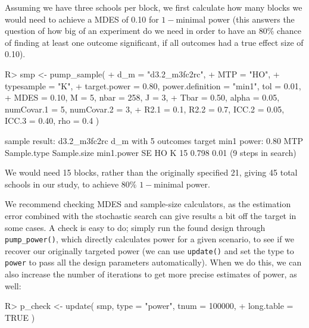\documentclass[
]{jss}
\begin{document}
Assuming we have three schools per block, we first calculate how many
blocks we would need to achieve a MDES of 0.10 for \(1-\)minimal power
(this answers the question of how big of an experiment do we need in
order to have an 80\% chance of finding at least one outcome
significant, if all outcomes had a true effect size of 0.10).

\begin{CodeChunk}
\begin{CodeInput}
R> smp <- pump_sample(
+   d_m = "d3.2_m3fc2rc",
+   MTP = "HO",
+   typesample = "K",
+   target.power = 0.80, power.definition = "min1", tol = 0.01,
+   MDES = 0.10, M = 5, nbar = 258, J = 3,
+   Tbar = 0.50, alpha = 0.05, numCovar.1 = 5, numCovar.2 = 3,
+   R2.1 = 0.1, R2.2 = 0.7, ICC.2 = 0.05, ICC.3 = 0.40, rho = 0.4 )
\end{CodeInput}
\end{CodeChunk}

\begin{CodeChunk}
\begin{CodeOutput}
sample result: d3.2_m3fc2rc d_m with 5 outcomes
  target min1 power: 0.80
 MTP Sample.type Sample.size min1.power   SE
  HO           K          15      0.798 0.01
    (9 steps in search)
\end{CodeOutput}
\end{CodeChunk}

We would need 15 blocks, rather than the originally specified 21, giving
45 total schools in our study, to achieve 80\% \(1-\)minimal power.

We recommend checking MDES and sample-size calculators, as the
estimation error combined with the stochastic search can give results a
bit off the target in some cases. A check is easy to do; simply run the
found design through \texttt{pump\_power()}, which directly calculates
power for a given scenario, to see if we recover our originally targeted
power (we can use \texttt{update()} and set the type to \texttt{power}
to pass all the design parameters automatically). When we do this, we
can also increase the number of iterations to get more precise estimates
of power, as well:

\begin{CodeChunk}
\begin{CodeInput}
R> p_check <- update( smp, type = "power", tnum = 100000,
+                    long.table = TRUE )
\end{CodeInput}
\end{CodeChunk}
\end{document}
